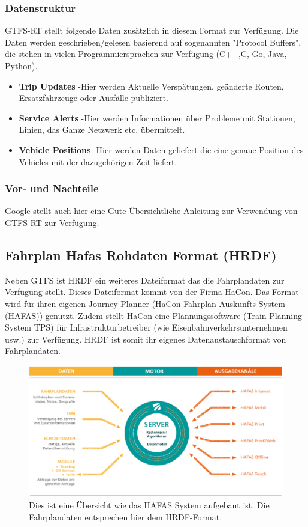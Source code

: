 \subsubsection{Datenstruktur}
\label{sec:gtfs-rt-datenstruktur}
GTFS-RT stellt folgende Daten zusätzlich in diesem Format zur Verfügung. Die Daten werden geschrieben/gelesen basierend auf sogenannten "Protocol Buffers", die stehen in vielen Programmiersprachen zur Verfügung (C++,C, Go, Java, Python).\cite{gtfs-rt}
\begin{itemize}
	\item{\textbf{Trip Updates}} -Hier werden Aktuelle Verspätungen, geänderte Routen, Ersatzfahrzeuge oder Ausfälle publiziert.  
	\item{\textbf{Service Alerts}} -Hier werden Informationen über Probleme mit Stationen,  Linien, das Ganze Netzwerk etc. übermittelt. 
	\item{\textbf{Vehicle Positions}} -Hier werden Daten geliefert die eine genaue Position des Vehicles mit der dazugehörigen Zeit liefert.\cite{gtfs-rt-google} 
\end{itemize}


\subsubsection{Vor- und Nachteile}
\label{sec:gtfs-rt-vornachteile}
Google stellt auch hier eine Gute Übersichtliche Anleitung zur Verwendung von GTFS-RT zur Verfügung.

\subsection{Fahrplan Hafas Rohdaten Format (HRDF)}
\label{subsec:hrdf}
Neben GTFS ist HRDF ein weiteres Dateiformat das die Fahrplandaten zur Verfügung stellt. 
Dieses Dateiformat kommt von der Firma HaCon. Das Format wird für ihren eigenen Journey Planner (HaCon Fahrplan-Auskunfts-System (HAFAS)) genutzt. Zudem stellt HaCon eine Plannungssoftware (Train Planning System TPS) für Infrastrukturbetreiber (wie Eisenbahnverkehrsunternehmen usw.) zur Verfügung. HRDF ist somit ihr eigenes Datenaustauschformat von Fahrplandaten.\cite{haconUebersicht}


\begin{figure}[]
	\centering
	\includegraphics[width=12cm]{img/HAFAS.png}
	\caption{Dies ist eine Übersicht wie das HAFAS System aufgebaut ist. Die Fahrplandaten entsprechen hier dem HRDF-Format. \cite{haconUebersicht}}
	\label{fig:hafas-uebersicht}
\end{figure}




